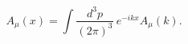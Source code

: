 \begin{equation}
  A_\mu (x) = \int \frac{d^3 p}{(2\pi)^3}~
              e^{-ikx} A_\mu (k).
\end{equation}

